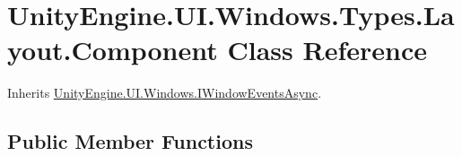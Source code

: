 \hypertarget{class_unity_engine_1_1_u_i_1_1_windows_1_1_types_1_1_layout_1_1_component}{}\section{Unity\+Engine.\+U\+I.\+Windows.\+Types.\+Layout.\+Component Class Reference}
\label{class_unity_engine_1_1_u_i_1_1_windows_1_1_types_1_1_layout_1_1_component}


Inherits \hyperlink{interface_unity_engine_1_1_u_i_1_1_windows_1_1_i_window_events_async}{Unity\+Engine.\+U\+I.\+Windows.\+I\+Window\+Events\+Async}.

\subsection*{Public Member Functions}
